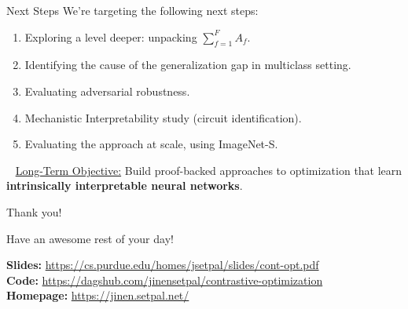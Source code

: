 \documentclass{beamer}
\begin{document}
\begin{frame}{Next Steps}
	We're targeting the following next steps:
	\begin{enumerate}[label=\arabic*.]
		\item Exploring a level deeper: unpacking $\sum_{f=1}^F A_f$.
		\item Identifying the cause of the generalization gap in multiclass setting.
		\item Evaluating adversarial robustness.
		\item Mechanistic Interpretability study (circuit identification).
		\item Evaluating the approach at scale, using ImageNet-S.
	\end{enumerate}
	~\newline \pause
	\underline{Long-Term Objective:} Build proof-backed approaches to optimization that learn \textbf{intrinsically interpretable neural networks}.
\end{frame}

\begin{frame}{Thank you!}
	\begin{center}
		Have an awesome rest of your day!
	\end{center}
	\begin{center}
		\small
		\textbf{Slides:} \url{https://cs.purdue.edu/homes/jsetpal/slides/cont-opt.pdf} \\
		\textbf{Code:} \url{https://dagshub.com/jinensetpal/contrastive-optimization} \newline \\
		\textbf{Homepage:} \url{https://jinen.setpal.net/}
	\end{center}
\end{frame}
\end{document}
